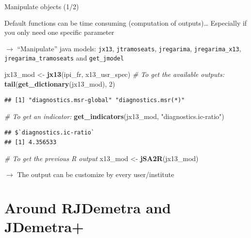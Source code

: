\documentclass[10pt,xcolor=table,color={dvipsnames,usenames},ignorenonframetext,usepdftitle=false,french]{beamer}
\newenvironment{Shaded}{\begin{snugshade}}{\end{snugshade}}
\newcommand{\CommentTok}[1]{\textcolor[rgb]{0.56,0.35,0.01}{\textit{#1}}}
\newcommand{\DecValTok}[1]{\textcolor[rgb]{0.00,0.00,0.81}{#1}}
\newcommand{\KeywordTok}[1]{\textcolor[rgb]{0.13,0.29,0.53}{\textbf{#1}}}
\newcommand{\NormalTok}[1]{#1}
\newcommand{\StringTok}[1]{\textcolor[rgb]{0.31,0.60,0.02}{#1}}
\begin{document}
\begin{frame}[fragile]{Manipulate \faJava{} objects (1/2)}
\protect\hypertarget{manipulate-objects-12}{}

\footnotesize

Default functions can be time consuming (computation of outputs)\ldots{}
Especially if you only need one specific parameter

\(\rightarrow\) ``Manipulate'' java models: \texttt{jx13},
\texttt{jtramoseats}, \texttt{jregarima}, \texttt{jregarima\_x13},
\texttt{jregarima\_tramoseats} and \texttt{get\_jmodel}

\begin{Shaded}
\begin{Highlighting}[]
\NormalTok{jx13_mod <-}\StringTok{ }\KeywordTok{jx13}\NormalTok{(ipi_fr, x13_usr_spec)}
\CommentTok{# To get the available outputs:}
\KeywordTok{tail}\NormalTok{(}\KeywordTok{get_dictionary}\NormalTok{(jx13_mod), }\DecValTok{2}\NormalTok{)}
\end{Highlighting}
\end{Shaded}

\begin{verbatim}
## [1] "diagnostics.msr-global" "diagnostics.msr(*)"
\end{verbatim}

\begin{Shaded}
\begin{Highlighting}[]
\CommentTok{# To get an indicator:}
\KeywordTok{get_indicators}\NormalTok{(jx13_mod, }\StringTok{"diagnostics.ic-ratio"}\NormalTok{)}
\end{Highlighting}
\end{Shaded}

\begin{verbatim}
## $`diagnostics.ic-ratio`
## [1] 4.356533
\end{verbatim}

\begin{Shaded}
\begin{Highlighting}[]
\CommentTok{# To get the previous R output}
\NormalTok{x13_mod <-}\StringTok{ }\KeywordTok{jSA2R}\NormalTok{(jx13_mod)}
\end{Highlighting}
\end{Shaded}

\(\rightarrow\) The output can be customize by every user/institute

\end{frame}

\hypertarget{around-rjdemetra-and-jdemetra}{%
\section{Around RJDemetra and
JDemetra+}\label{around-rjdemetra-and-jdemetra}}
\end{document}
